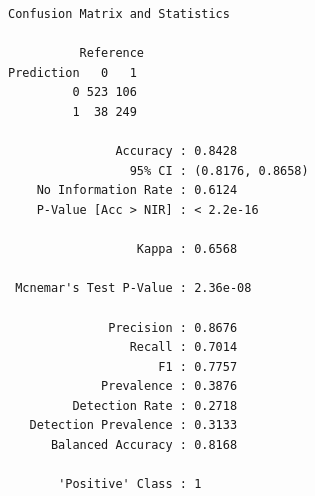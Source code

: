\documentclass[
  letterpaper,
  DIV=11,
  numbers=noendperiod]{scrartcl}
\newenvironment{Shaded}{\begin{snugshade}}{\end{snugshade}}
\newcommand{\AttributeTok}[1]{\textcolor[rgb]{0.40,0.45,0.13}{#1}}
\newcommand{\FunctionTok}[1]{\textcolor[rgb]{0.28,0.35,0.67}{#1}}
\newcommand{\NormalTok}[1]{\textcolor[rgb]{0.00,0.23,0.31}{#1}}
\newcommand{\OtherTok}[1]{\textcolor[rgb]{0.00,0.23,0.31}{#1}}
\newcommand{\SpecialCharTok}[1]{\textcolor[rgb]{0.37,0.37,0.37}{#1}}
\newcommand{\StringTok}[1]{\textcolor[rgb]{0.13,0.47,0.30}{#1}}
\begin{document}
\begin{verbatim}
Confusion Matrix and Statistics

          Reference
Prediction   0   1
         0 523 106
         1  38 249
                                          
               Accuracy : 0.8428          
                 95% CI : (0.8176, 0.8658)
    No Information Rate : 0.6124          
    P-Value [Acc > NIR] : < 2.2e-16       
                                          
                  Kappa : 0.6568          
                                          
 Mcnemar's Test P-Value : 2.36e-08        
                                          
              Precision : 0.8676          
                 Recall : 0.7014          
                     F1 : 0.7757          
             Prevalence : 0.3876          
         Detection Rate : 0.2718          
   Detection Prevalence : 0.3133          
      Balanced Accuracy : 0.8168          
                                          
       'Positive' Class : 1               
                                          
\end{verbatim}

\begin{Shaded}
\end{Shaded}
\end{document}

